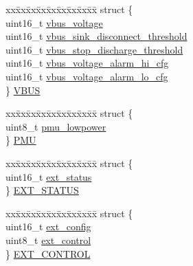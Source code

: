 \begin{DoxyCompactItemize}
\begin{tabbing}
\end{tabbing}\item 
\begin{tabbing}
xx\=xx\=xx\=xx\=xx\=xx\=xx\=xx\=xx\=\kill
struct \{\\
\>uint16\_t \hyperlink{structpd__phy__TCPC__reg__cache__t_a77cd19f5675645cf641bd5c47b705bf7}{vbus\_voltage}\\
\>uint16\_t \hyperlink{structpd__phy__TCPC__reg__cache__t_afd03d7ab726af896b632adfafa3d3f45}{vbus\_sink\_disconnect\_threshold}\\
\>uint16\_t \hyperlink{structpd__phy__TCPC__reg__cache__t_afc4b4051f3a05cbfe3b0e90cb4cfd3f3}{vbus\_stop\_discharge\_threshold}\\
\>uint16\_t \hyperlink{structpd__phy__TCPC__reg__cache__t_a15ead00db63289bc3add98d923806ca6}{vbus\_voltage\_alarm\_hi\_cfg}\\
\>uint16\_t \hyperlink{structpd__phy__TCPC__reg__cache__t_acc33aa4cf0c9d65fd0b4b6530b925d87}{vbus\_voltage\_alarm\_lo\_cfg}\\
\} \hyperlink{structpd__phy__TCPC__reg__cache__t_ab24b76010533fea692b8f6ff4f7d3fea}{VBUS}\\

\end{tabbing}\item 
\begin{tabbing}
xx\=xx\=xx\=xx\=xx\=xx\=xx\=xx\=xx\=\kill
struct \{\\
\>uint8\_t \hyperlink{structpd__phy__TCPC__reg__cache__t_a77ebfa121228fc5465d99db37998175b}{pmu\_lowpower}\\
\} \hyperlink{structpd__phy__TCPC__reg__cache__t_ad943ee4fe1c61e4938e5db59ba275898}{PMU}\\

\end{tabbing}\item 
\begin{tabbing}
xx\=xx\=xx\=xx\=xx\=xx\=xx\=xx\=xx\=\kill
struct \{\\
\>uint16\_t \hyperlink{structpd__phy__TCPC__reg__cache__t_ae8546f1fc28db9e0b79df7dea7cf902b}{ext\_status}\\
\} \hyperlink{structpd__phy__TCPC__reg__cache__t_aaedc9164647071c46cde97df5e92b769}{EXT\_STATUS}\\

\end{tabbing}\item 
\begin{tabbing}
xx\=xx\=xx\=xx\=xx\=xx\=xx\=xx\=xx\=\kill
struct \{\\
\>uint16\_t \hyperlink{structpd__phy__TCPC__reg__cache__t_adeec58b66e622f403301a4996e9e3157}{ext\_config}\\
\>uint8\_t \hyperlink{structpd__phy__TCPC__reg__cache__t_ad776feb48742cfe1be66850000367e2e}{ext\_control}\\
\} \hyperlink{structpd__phy__TCPC__reg__cache__t_a3b1495d18f8ed0bb88c5acffa1a031b2}{EXT\_CONTROL}\\

\end{tabbing}\end{DoxyCompactItemize}


